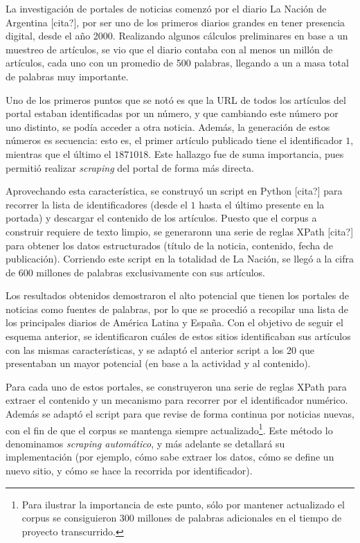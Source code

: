 La investigación de portales de noticias comenzó por el diario La Nación de Argentina [cita?], por
ser uno de los primeros diarios grandes en tener presencia digital, desde el año 2000. Realizando
algunos cálculos preliminares en base a un muestreo de artículos, se vio que el diario contaba con
al menos un millón de artículos, cada uno con un promedio de 500 palabras, llegando a un a masa total
de palabras muy importante.

Uno de los primeros puntos que se notó es que la URL de todos los artículos del portal estaban
identificadas por un número, y que cambiando este número por uno distinto, se podía acceder a otra
noticia. Además, la generación de estos números es secuencia: esto es, el primer artículo publicado
tiene el identificador $1$, mientras que el último el $1871018$. Este hallazgo fue de suma
importancia, pues permitió realizar \textit{scraping} del portal de forma más directa.

Aprovechando esta característica, se construyó un script en Python [cita?] para recorrer la lista de
identificadores (desde el $1$ hasta el último presente en la portada) y descargar el contenido de
los artículos. Puesto que el corpus a construir requiere de texto limpio, se generaronn una serie de
reglas XPath [cita?] para obtener los datos estructurados (título de la noticia, contenido, fecha de
publicación). Corriendo este script en la totalidad de La Nación, se llegó a la cifra de 600
millones de palabras exclusivamente con sus artículos.

Los resultados obtenidos demostraron el alto potencial que tienen los portales de noticias como
fuentes de palabras, por lo que se procedió a recopilar una lista de los principales diarios de
América Latina y España. Con el objetivo de seguir el esquema anterior, se identificaron cuáles de
estos sitios identificaban sus artículos con las mismas características, y se adaptó el anterior
script a los 20 que presentaban un mayor potencial (en base a la actividad y al contenido).

Para cada uno de estos portales, se construyeron una serie de reglas XPath para extraer el contenido
y un mecanismo para recorrer por el identificador numérico. Además se adaptó el script para que
revise de forma continua por noticias nuevas, con el fin de que el corpus se mantenga siempre
actualizado\footnote{Para ilustrar la importancia de este punto, sólo por mantener actualizado el
corpus se consiguieron 300 millones de palabras adicionales en el tiempo de proyecto
transcurrido.}. Este método lo denominamos \textit{scraping automático}, y más adelante se detallará
su implementación (por ejemplo, cómo sabe extraer los datos, cómo se define un nuevo sitio, y cómo se
hace la recorrida por identificador).

